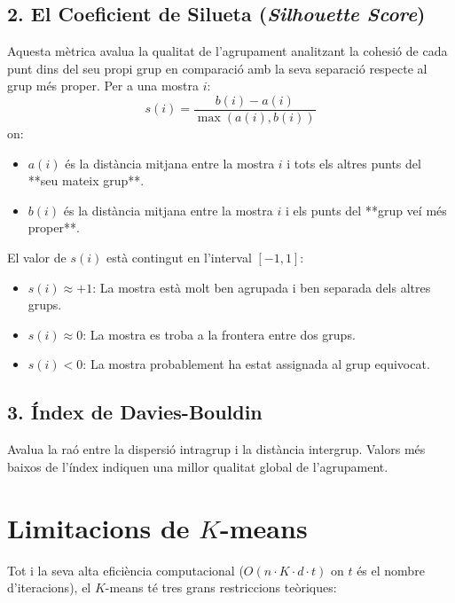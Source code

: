 \documentclass[11pt, a4paper]{article}
\begin{document}
\subsection{2. El Coeficient de Silueta (\textit{Silhouette Score})}
Aquesta mètrica avalua la qualitat de l'agrupament analitzant la cohesió de cada punt dins del seu propi grup en comparació amb la seva separació respecte al grup més proper. Per a una mostra $i$:
\[
s(i) = \frac{b(i) - a(i)}{\max(a(i), b(i))}
\]
on:
\begin{itemize}[nosep]
    \item $a(i)$ és la distància mitjana entre la mostra $i$ i tots els altres punts del **seu mateix grup**.
    \item $b(i)$ és la distància mitjana entre la mostra $i$ i els punts del **grup veí més proper**.
\end{itemize}
El valor de $s(i)$ està contingut en l'interval $[-1, 1]$:
\begin{itemize}[nosep]
    \item $s(i) \approx +1$: La mostra està molt ben agrupada i ben separada dels altres grups.
    \item $s(i) \approx 0$: La mostra es troba a la frontera entre dos grups.
    \item $s(i) < 0$: La mostra probablement ha estat assignada al grup equivocat.
\end{itemize}

\subsection{3. Índex de Davies-Bouldin}
Avalua la raó entre la dispersió intragrup i la distància intergrup. Valors més baixos de l'índex indiquen una millor qualitat global de l'agrupament.

\section{Limitacions de $K$-means}

Tot i la seva alta eficiència computacional ($O(n \cdot K \cdot d \cdot t)$ on $t$ és el nombre d'iteracions), el $K$-means té tres grans restriccions teòriques:
\end{document}
